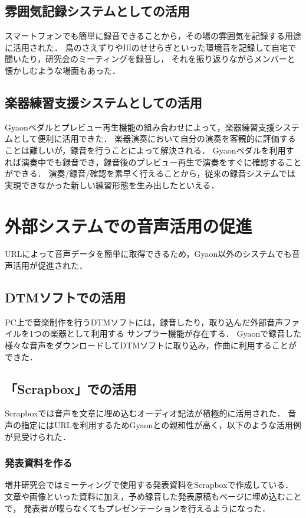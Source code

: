 \subsection{雰囲気記録システムとしての活用}
スマートフォンでも簡単に録音できることから，その場の雰囲気を記録する用途に活用された．
鳥のさえずりや川のせせらぎといった環境音を記録して自宅で聞いたり，研究会のミーティングを録音し，
それを振り返りながらメンバーと懐かしむような場面もあった．

\subsection{楽器練習支援システムとしての活用}
Gyaonペダルとプレビュー再生機能の組み合わせによって，楽器練習支援システムとして便利に活用できた．
楽器演奏において自分の演奏を客観的に評価することは難しいが，録音を行うことによって解決される．
Gyaonペダルを利用すれば演奏中でも録音でき，録音後のプレビュー再生で演奏をすぐに確認することができる．
演奏/録音/確認を素早く行えることから，従来の録音システムでは実現できなかった新しい練習形態を生み出したといえる．




\section{外部システムでの音声活用の促進}
URLによって音声データを簡単に取得できるため，Gyaon以外のシステムでも音声活用が促進された．

\subsection{DTMソフトでの活用}
PC上で音楽制作を行うDTMソフトには，録音したり，取り込んだ外部音声ファイルを1つの楽器として利用する
サンプラー機能が存在する．
Gyaonで録音した様々な音声をダウンロードしてDTMソフトに取り込み，作曲に利用することができた．

\subsection{「Scrapbox」での活用}
Scrapboxでは音声を文章に埋め込むオーディオ記法が積極的に活用された．
音声の指定にはURLを利用するためGyaonとの親和性が高く，以下のような活用例が見受けられた．

\subsubsection{発表資料を作る}
増井研究会ではミーティングで使用する発表資料をScrapboxで作成している．
文章や画像といった資料に加え，予め録音した発表原稿もページに埋め込むことで，
発表者が喋らなくてもプレゼンテーションを行えるようになった．

